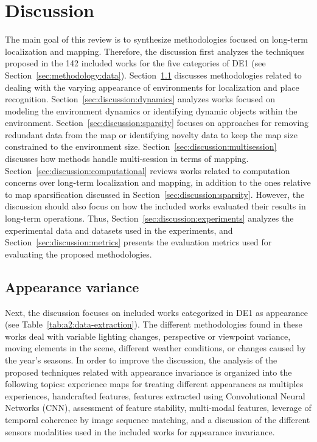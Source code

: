 \section{Discussion}
\label{sec:discussion}

The main goal of this review is to synthesize methodologies focused on long-term localization and mapping. Therefore, the discussion first analyzes the techniques proposed in the 142 included works for the five categories of DE1 (see Section~\ref{sec:methodology:data}). Section~\ref{sec:discussion:appearance} discusses methodologies related to dealing with the varying appearance of environments for localization and place recognition. Section~\ref{sec:discussion:dynamics} analyzes works focused on modeling the environment dynamics or identifying dynamic objects within the environment. Section~\ref{sec:discussion:sparsity} focuses on approaches for removing redundant data from the map or identifying novelty data to keep the map size constrained to the environment size. Section~\ref{sec:discussion:multisession} discusses how methods handle multi-session in terms of mapping. Section~\ref{sec:discussion:computational} reviews works related to computation concerns over long-term localization and mapping, in addition to the ones relative to map sparsification discussed in Section~\ref{sec:discussion:sparsity}. However, the discussion should also focus on how the included works evaluated their results in long-term operations. Thus, Section~\ref{sec:discussion:experiments} analyzes the experimental data and datasets used in the experiments, and Section~\ref{sec:discussion:metrics} presents the evaluation metrics used for evaluating the proposed methodologies.





\subsection{Appearance variance}
\label{sec:discussion:appearance}

Next, the discussion focuses on included works categorized in DE1 as appearance (see Table~\ref{tab:a2:data-extraction}). The different methodologies found in these works deal with variable lighting changes, perspective or viewpoint variance, moving elements in the scene, different weather conditions, or changes caused by the year's seasons.
In order to improve the discussion, the analysis of the proposed techniques related with appearance invariance is organized into the following topics: experience maps for treating different appearances as multiples experiences, handcrafted features, features extracted using Convolutional Neural Networks (CNN), assessment of feature stability, multi-modal features, leverage of temporal coherence by image sequence matching, and a discussion of the different sensors modalities used in the included works for appearance invariance.



